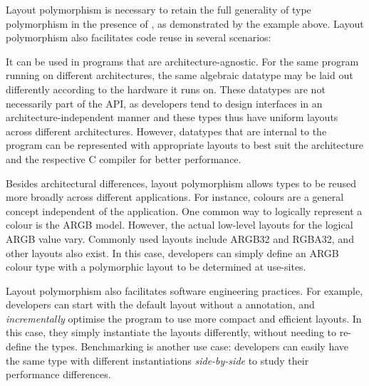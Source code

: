 Layout polymorphism is necessary to retain the full generality of type
polymorphism in the presence of \dargent, as demonstrated by the example
above.
%
Layout polymorphism also facilitates code reuse in several scenarios:
\begin{enumerate*}
  \item It can be used in programs that are architecture-agnostic.
    For the same program running on different architectures, the same algebraic datatype
    may be laid out differently according to the hardware it runs on. These datatypes are
    not necessarily part of the API, as developers tend to design interfaces
    in an architecture-independent manner and these types thus have uniform layouts
    across different architectures. However, datatypes that are internal to the program
    can be represented with appropriate layouts to best suit the architecture and the
    respective C compiler for better performance.
  \item Besides architectural differences, layout polymorphism allows types to be reused more
    broadly across different applications.
    For instance, colours are a general concept independent of the application. One common
    way to logically represent a colour is the ARGB model. However, the actual low-level layouts
    for the logical ARGB value vary. Commonly used layouts include ARGB32 and RGBA32, and
    other layouts also exist. In this case, developers can simply define an ARGB colour type with a polymorphic layout to be determined at use-sites.
  \item Layout polymorphism also facilitates software engineering practices.
    For example, developers can start with the default layout without a \dargent annotation,
    and \emph{incrementally}
    optimise the program to use more compact and efficient \dargent layouts. In this
    case, they simply instantiate the layouts differently, without needing to
    re-define the types. Benchmarking is another use case: developers can easily have
    the same type with different instantiations \emph{side-by-side} to study their performance
    differences.
\end{enumerate*}




